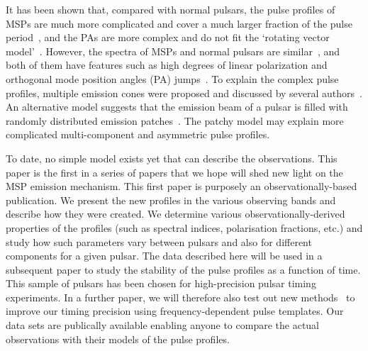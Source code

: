 \documentclass[useAMS,usenatbib]{mn2e}
\begin{document}
It has been shown that, compared with normal pulsars, the pulse profiles of MSPs are 
much more complicated and cover a much larger fraction of the pulse period~\citep{Yan11}, 
and the PAs are more complex and do not fit the `rotating vector model'~\citep[RVM,][]{Radhakrishnan69}.
%
However, the spectra of MSPs and normal pulsars are similar~\citep{Toscano98,Kramer98,Kramer99}, 
and both of them have features such as high degrees of linear polarization and orthogonal 
mode position angles (PA) jumps~\citep[see e.g.,][]{Thorsett90,Navarro97,Stairs99,Manchester04,Ord04}.
%
To explain the complex pulse profiles, multiple emission cones were proposed 
and discussed by several authors~\citep{Rankin93,Kramer94,Gupta03}. An alternative 
model suggests that the emission beam of a pulsar is filled with randomly 
distributed emission patches~\citep{Lyne88,Manchester95_2,Han01}. The patchy 
model may explain more complicated multi-component and asymmetric pulse profiles.
%

To date, no simple model exists yet that can describe the observations.  
%
This paper is the first in a series of papers that we hope will shed new light on 
the MSP emission mechanism. This first paper is purposely an observationally-based 
publication.  
%
We present the new profiles in the various observing bands and describe how they were 
created. We determine various observationally-derived properties of the profiles (such as 
spectral indices, polarisation fractions, etc.) and study how such parameters vary 
between pulsars and also for different components for a given pulsar.   
%
The data described here will be used in a subsequent paper to study the stability 
of the pulse profiles as a function of time. This sample of pulsars has been chosen for 
high-precision pulsar timing experiments. In a further paper, we will therefore also test 
out new methods~\citep[e.g.,][]{Pennucci14,Liu14} to improve our timing precision using 
frequency-dependent pulse templates.  
%
Our data sets are publically available enabling anyone to compare the actual 
observations with their models of the pulse profiles.
%
\end{document}
